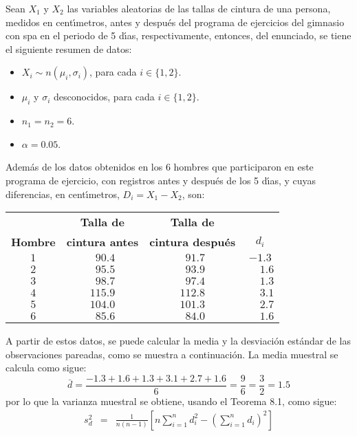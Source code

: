 \begin{solucion}
 Sean $X_1$ y $X_2$ las variables aleatorias de las tallas de cintura de una persona, medidos en cent\'{\i}metros, antes y despu\'es del programa de ejercicios del gimnasio con spa en el periodo de 5 d\'{\i}as, respectivamente, entonces, del enunciado, se tiene el siguiente resumen de datos:
 \begin{itemize}
  \item $X_i \sim n\left( \mu_i, \sigma_i \right)$, para cada $i \in \{ 1, 2 \}$.
  \item $\mu_i$ y $\sigma_i$ desconocidos, para cada $i \in \{ 1,2 \}$.
  \item $n_1 = n_2 = 6$.
  \item $\alpha = 0.05$.
 \end{itemize}
 Adem\'as de los datos obtenidos en los 6 hombres que participaron en este programa de ejercicio, con registros antes y despu\'es de los 5 d\'{\i}as, y cuyas diferencias, en cent\'{\i}metros, $D_i = X_1 - X_2$, son:
 \begin{center}
  \begin{tabular}{cccc}
   & \textbf{Talla de} & \textbf{Talla de} \\
   \textbf{Hombre} & \textbf{cintura antes} & \textbf{cintura despu\'es} & $d_i$ \\
   \hline 
   $1$ & $\phantom{1}90.4$ & $\phantom{1}91.7$ & $-1.3$ \\
   $2$ & $\phantom{1}95.5$ & $\phantom{1}93.9$ & $\phantom{-}1.6$ \\
   $3$ & $\phantom{1}98.7$ & $\phantom{1}97.4$ & $\phantom{-}1.3$ \\
   $4$ & $115.9$ & $112.8$ & $\phantom{-}3.1$ \\
   $5$ & $104.0$ & $101.3$ & $\phantom{-}2.7$ \\
   $6$ & $\phantom{1}85.6$ & $\phantom{1}84.0$ & $\phantom{-}1.6$
  \end{tabular}
 \end{center}
 A partir de estos datos, se puede calcular la media y la desviaci\'on est\'andar de las observaciones pareadas, como se muestra a continuaci\'on. La media muestral se calcula como sigue:
 \begin{equation*}
  \bar{d} = \frac{-1.3 + 1.6 + 1.3 + 3.1 + 2.7 + 1.6}{6} = \frac{9}{6} = \frac{3}{2} = 1.5
 \end{equation*}
 por lo que la varianza muestral se obtiene, usando el Teorema 8.1, como sigue:
 \begin{eqnarray*}
  s_d^2 & = & \frac{1}{n(n-1)} \left[ n\sum_{i=1}^n d_i^2 - \left( \sum_{i=1}^n d_i \right)^2 \right] \\

\end{eqnarray*}
\end{solucion}

